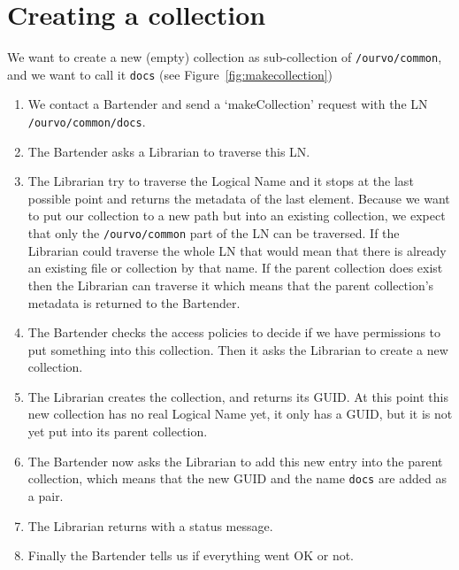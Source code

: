\documentclass{book}
\begin{document}

\section{Creating a collection} %
\label{sec:creating_a_collection}
\begin{figure}[ht]
\end{figure}

We want to create a new (empty) collection as sub-collection of \verb#/ourvo/common#, and we want to call it \verb!docs! (see Figure~\ref{fig:makecollection})

\begin{enumerate}
    \item We contact a Bartender and send a `makeCollection' request with the LN \verb!/ourvo/common/docs!.
    \item The Bartender asks a Librarian to traverse this LN.
    \item The Librarian try to traverse the Logical Name and it stops at the last possible point and returns the metadata of the last element. Because we want to put our collection to a new path but into an existing collection, we expect that only the \verb#/ourvo/common# part of the LN can be traversed. If the Librarian could traverse the whole LN that would mean that there is already an existing file or collection by that name. If the parent collection does exist then the Librarian can traverse it which means that the parent collection's metadata is returned to the Bartender. 
    \item The Bartender checks the access policies to decide if we have permissions to put something into this collection. Then it asks the Librarian to create a new collection.
    \item The Librarian creates the collection, and returns its GUID. At this point this new collection has no real Logical Name yet, it only has a GUID, but it is not yet put into its parent collection.
    \item The Bartender now asks the Librarian to add this new entry into the parent collection, which means that the new GUID and the name \verb!docs! are added as a pair.
    \item The Librarian returns with a status message.
    \item Finally the Bartender tells us if everything went OK or not.
\end{enumerate}
\end{document}
